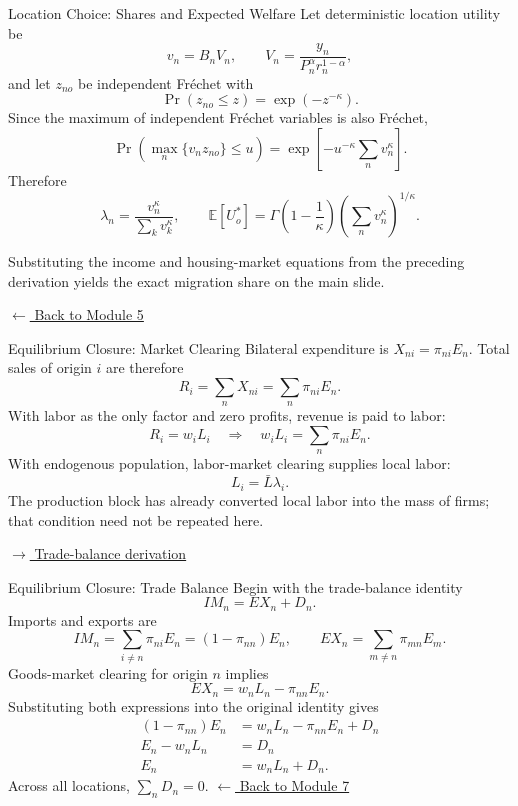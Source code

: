 \documentclass[aspectratio=169,11pt]{beamer}
\newcommand{\E}{\mathbb E}
\newcommand{\backlink}[2]{%
  \hyperlink{#1}{\textcolor{blue1}{\footnotesize
  \(\longleftarrow\) #2}}}
\begin{document}
\begin{frame}[label=appMigration]{Location Choice: Shares and Expected Welfare}
  \footnotesize
  Let deterministic location utility be
  \[
    v_n=B_nV_n,
    \qquad
    V_n=\frac{y_n}{P_n^\alpha r_n^{1-\alpha}},
  \]
  and let \(z_{no}\) be independent Fr\'echet with
  \[
    \Pr(z_{no}\leq z)=\exp(-z^{-\kappa}).
  \]
  Since the maximum of independent Fr\'echet variables is also Fr\'echet,
  \[
    \Pr\!\left(\max_n\{v_nz_{no}\}\leq u\right)
    =
    \exp\left[-u^{-\kappa}\sum_nv_n^\kappa\right].
  \]
  Therefore
  \[
    \lambda_n
    =
    \frac{v_n^\kappa}{\sum_kv_k^\kappa},
    \qquad
    \E[U_o^*]
    =
    \Gamma\!\left(1-\frac{1}{\kappa}\right)
    \left(\sum_nv_n^\kappa\right)^{1/\kappa}.
  \]

  Substituting the income and housing-market equations from the preceding
  derivation yields the exact migration share on the main slide.

  \smallskip
  \hfill\backlink{mainMigration}{Back to Module 5}
\end{frame}

\begin{frame}[label=appEquilibrium]{Equilibrium Closure: Market Clearing}
  Bilateral expenditure is \(X_{ni}=\pi_{ni}E_n\). Total sales of origin
  \(i\) are therefore
  \[
    R_i=\sum_nX_{ni}=\sum_n\pi_{ni}E_n.
  \]
  With labor as the only factor and zero profits, revenue is paid to labor:
  \[
    R_i=w_iL_i
    \quad\Longrightarrow\quad
    w_iL_i=\sum_n\pi_{ni}E_n.
  \]
  With endogenous population, labor-market clearing supplies local labor:
  \[
    L_i=\bar L\lambda_i.
  \]
  The production block has already converted local labor into the mass of firms;
  that condition need not be repeated here.

  \smallskip
  \hfill\hyperlink{appTradeBalance}{\textcolor{blue1}{\footnotesize
  \(\longrightarrow\) Trade-balance derivation}}
\end{frame}

\begin{frame}[label=appTradeBalance]{Equilibrium Closure: Trade Balance}
  Begin with the trade-balance identity
  \[
    IM_n=EX_n+D_n.
  \]
  Imports and exports are
  \[
    IM_n=\sum_{i\neq n}\pi_{ni}E_n=(1-\pi_{nn})E_n,
    \qquad
    EX_n=\sum_{m\neq n}\pi_{mn}E_m.
  \]
  Goods-market clearing for origin \(n\) implies
  \[
    EX_n=w_nL_n-\pi_{nn}E_n.
  \]
  Substituting both expressions into the original identity gives
  \[
  \begin{aligned}
    (1-\pi_{nn})E_n
      &=w_nL_n-\pi_{nn}E_n+D_n\\
    E_n-w_nL_n
      &=D_n\\
    E_n
      &=w_nL_n+D_n.
  \end{aligned}
  \]
  Across all locations, \(\sum_nD_n=0\).
  \hfill\backlink{mainEquilibrium}{Back to Module 7}
\end{frame}
\end{document}
